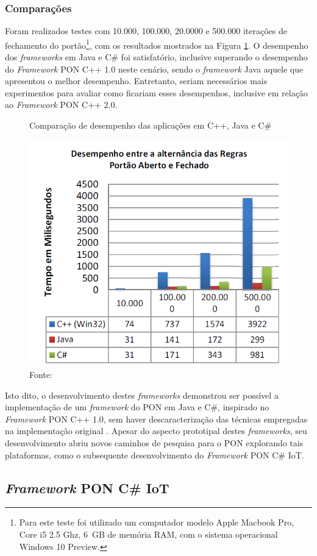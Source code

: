 \subsubsection{Comparações}

Foram realizados testes com 10.000, 100.000, 20.0000 e 500.000 iterações de
fechamento do portão\footnote{Para este teste foi utilizado um computador modelo
Apple Macbook Pro, Core i5 2.5 Ghz, 6 GB de memória RAM, com o sistema
operacional Windows 10 Preview.}, com os resultados mostrados na Figura
\ref{fig:comp_henzen}. O desempenho dos \textit{frameworks} em Java e C\# foi
satisfatório, inclusive superando o desempenho do \textit{Framework} PON C++ 1.0
neste cenário, sendo o \textit{framework} Java aquele que apresentou o melhor
desempenho. Entretanto, seriam necessários mais experimentos para avaliar como
ficariam esses desempenhos, inclusive em relação ao \textit{Framework} PON C++
2.0.

\begin{figure}[!htb]
  \centering
  \caption{Comparação de desempenho das aplicações em C++, Java e C\#}
  \includegraphics[width=.5\textwidth]{../figures/comp_henzen.png}
  \caption*{Fonte: }
  \label{fig:comp_henzen}
\end{figure}

Isto dito, o desenvolvimento destes \textit{frameworks} demonstrou ser possível
a implementação de um \textit{framework} do PON em Java e C\#, inspirado no
\textit{Framework} PON C++ 1.0, sem haver descaracterização das técnicas
empregadas na implementação original \cite{henzen_2015}. Apesar do aspecto
prototipal destes \textit{frameworks}, seu desenvolvimento abriu novos caminhos
de pesquisa para o PON explorando tais plataformas, como o subsequente
desenvolvimento do \textit{Framework} PON C\# IoT.

\FloatBarrier

\subsection{\textit{Framework} PON C\# IoT}

